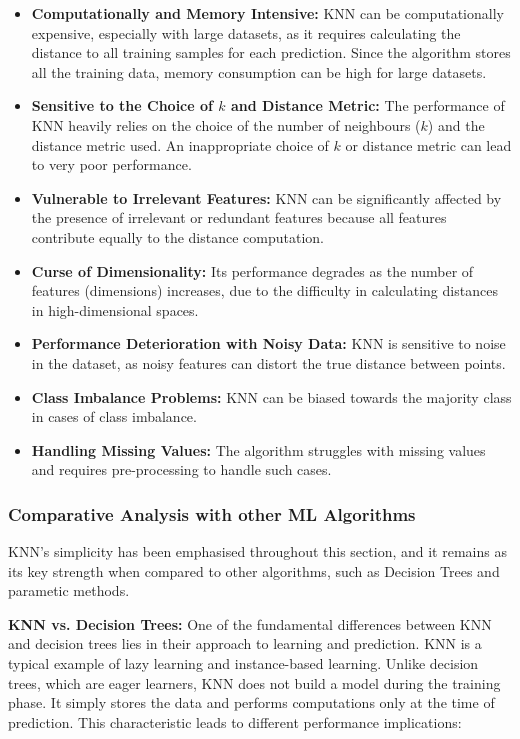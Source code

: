 \documentclass[letterpaper,10pt]{article}
\begin{document}
\begin{itemize}
    \item \textbf{Computationally and Memory Intensive:} KNN can be computationally expensive, especially with large datasets, as it requires calculating the distance to all training samples for each prediction. Since the algorithm stores all the training data, memory consumption can be high for large datasets.

    \item \textbf{Sensitive to the Choice of \( k \) and Distance Metric:} The performance of KNN heavily relies on the choice of the number of neighbours (\( k \)) and the distance metric used. An inappropriate choice of \( k \) or distance metric can lead to very poor performance.

    \item \textbf{Vulnerable to Irrelevant Features:} KNN can be significantly affected by the presence of irrelevant or redundant features because all features contribute equally to the distance computation.

    \item \textbf{Curse of Dimensionality:} Its performance degrades as the number of features (dimensions) increases, due to the difficulty in calculating distances in high-dimensional spaces.

    \item \textbf{Performance Deterioration with Noisy Data:} KNN is sensitive to noise in the dataset, as noisy features can distort the true distance between points.

    \item \textbf{Class Imbalance Problems:} KNN can be biased towards the majority class in cases of class imbalance.

    \item \textbf{Handling Missing Values:} The algorithm struggles with missing values and requires pre-processing to handle such cases.
\end{itemize}
\subsubsection{Comparative Analysis with other ML Algorithms}
KNN's simplicity has been emphasised throughout this section, and it remains as its key strength when compared to other algorithms, such as Decision Trees and parametic methods. \par

\textbf{KNN vs. Decision Trees:} One of the fundamental differences between KNN and decision trees lies in their approach to learning and prediction. KNN is a typical example of lazy learning and instance-based learning. Unlike decision trees, which are eager learners, KNN does not build a model during the training phase. It simply stores the data and performs computations only at the time of prediction. This characteristic leads to different performance implications:
\end{document}
